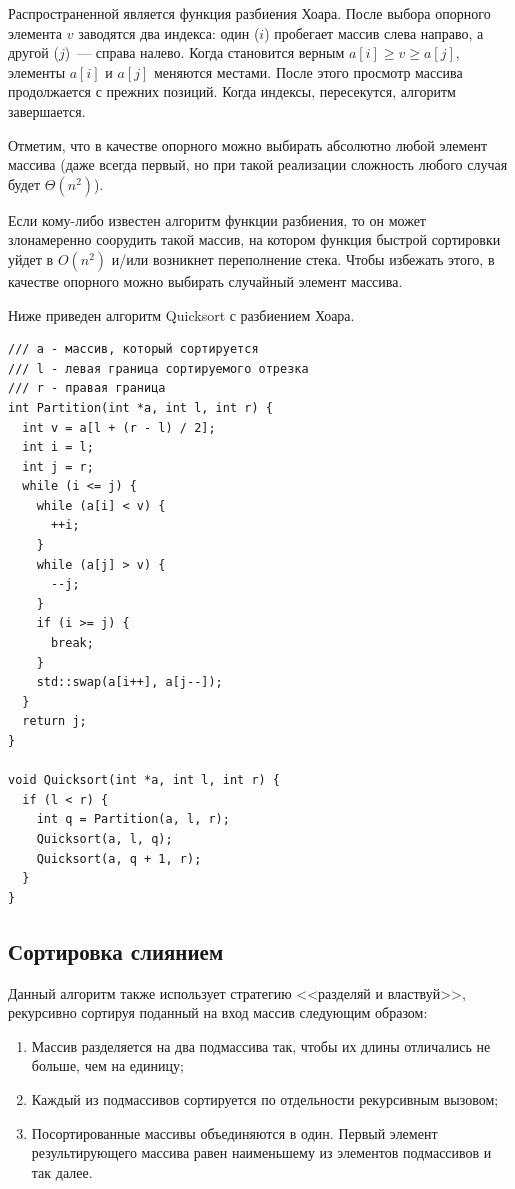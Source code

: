 Распространенной является функция разбиения Хоара. После выбора опорного элемента $v$
заводятся два индекса: один ($i$) пробегает массив слева направо, а другой ($j$)~--- справа налево.
Когда становится верным $a[i] \geq v \geq a[j]$, элементы $a[i]$ и $a[j]$
меняются местами. После этого просмотр массива продолжается с прежних позиций. Когда индексы,
пересекутся, алгоритм завершается.

Отметим, что в качестве опорного можно выбирать абсолютно любой элемент массива
(даже всегда первый, но при такой реализации сложность любого случая будет $\Theta(n^2)$).

Если кому-либо известен алгоритм функции разбиения, то он может злонамеренно соорудить
такой массив, на котором функция быстрой сортировки уйдет в $O(n^2)$ и/или возникнет
переполнение стека. Чтобы избежать этого, в качестве опорного можно выбирать случайный
элемент массива.

Ниже приведен алгоритм Quicksort с разбиением Хоара.
\begin{verbatim}
/// a - массив, который сортируется
/// l - левая граница сортируемого отрезка
/// r - правая граница
int Partition(int *a, int l, int r) {
  int v = a[l + (r - l) / 2];
  int i = l;
  int j = r;
  while (i <= j) {
    while (a[i] < v) {
      ++i;
    }
    while (a[j] > v) {
      --j;
    }
    if (i >= j) {
      break;
    }
    std::swap(a[i++], a[j--]);
  }
  return j;
}

void Quicksort(int *a, int l, int r) {
  if (l < r) {
    int q = Partition(a, l, r);
    Quicksort(a, l, q);
    Quicksort(a, q + 1, r);
  }
}
\end{verbatim}

\subsection{Сортировка слиянием}
Данный алгоритм также использует стратегию <<разделяй и властвуй>>, рекурсивно сортируя
поданный на вход массив следующим образом:
\begin{enumerate}
  \item Массив разделяется на два подмассива так, чтобы их длины отличались не больше,
        чем на единицу;
  \item Каждый из подмассивов сортируется по отдельности рекурсивным вызовом;
  \item Посортированные массивы объединяются в один. Первый элемент результирующего 
        массива равен наименьшему из элементов подмассивов и так далее.
\end{enumerate}

